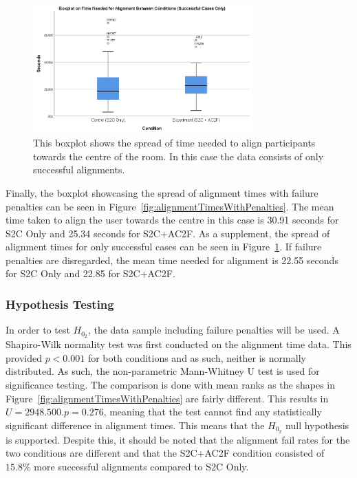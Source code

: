 \begin{figure}[tbph]
    \centering
    \includegraphics[width=0.75\textwidth]{figures/graphs/boxplotAlignmentTimesWithoutPenalties.png}
    \caption[Boxplot on Time Needed To Align Participants To Centre (Successful Cases Only)]{This boxplot shows the spread of time needed to align participants towards the centre of the room. In this case the data consists of only successful alignments.}
    \label{fig:AlignmentTimesWithoutPenalties}
\end{figure}

Finally, the boxplot showcasing the spread of alignment times with failure penalties can be seen in Figure~\ref{fig:alignmentTimesWithPenalties}. The mean time taken to align the user towards the centre in this case is 30.91 seconds for S2C Only and 25.34 seconds for S2C+AC2F. As a supplement, the spread of alignment times for only successful cases can be seen in Figure~\ref{fig:AlignmentTimesWithoutPenalties}. If failure penalties are disregarded, the mean time needed for alignment is 22.55 seconds for S2C Only and 22.85 for S2C+AC2F. 

\subsubsection{Hypothesis Testing}
In order to test $H_{0_2}$, the data sample including failure penalties will be used. A Shapiro-Wilk normality test was first conducted on the alignment time data. This provided $p < 0.001$ for both conditions and as such, neither is normally distributed. As such, the non-parametric Mann-Whitney U test is used for significance testing. The comparison is done with mean ranks as the shapes in Figure~\ref{fig:alignmentTimesWithPenalties} are fairly different. This results in $U = 2948.500. p = 0.276$, meaning that the test cannot find any statistically significant difference in alignment times. This means that the $H_{0_2}$ null hypothesis is supported. Despite this, it should be noted that the alignment fail rates for the two conditions are different and that the S2C+AC2F condition consisted of $15.8\%$ more successful alignments compared to S2C Only. 

